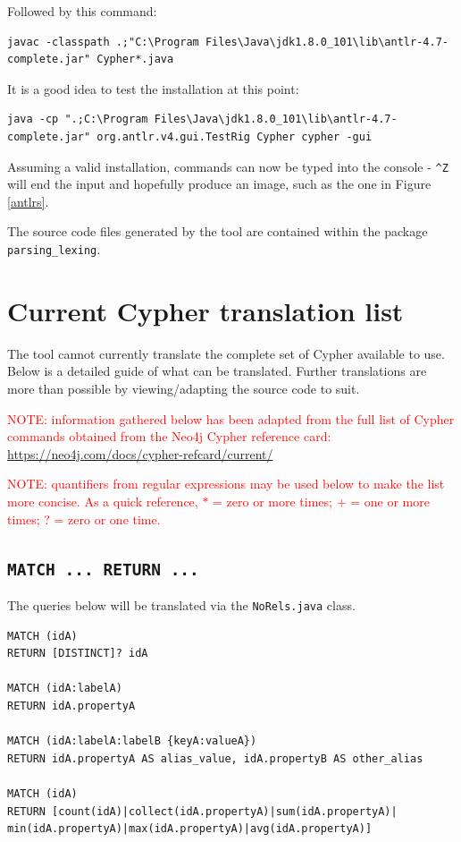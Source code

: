 \documentclass[letterpaper]{ltxdoc}
\begin{document}
Followed by this command:

\begin{lstlisting}[style=DOS]
javac -classpath .;"C:\Program Files\Java\jdk1.8.0_101\lib\antlr-4.7-complete.jar" Cypher*.java
\end{lstlisting}

It is a good idea to test the installation at this point:

\begin{lstlisting}[style=DOS]
java -cp ".;C:\Program Files\Java\jdk1.8.0_101\lib\antlr-4.7-complete.jar" org.antlr.v4.gui.TestRig Cypher cypher -gui
\end{lstlisting}

Assuming a valid installation, commands can now be typed into the console - \texttt{\^{}Z} will end the input and hopefully produce an image, such as the one in Figure \ref{antlrs}.

The source code files generated by the tool are contained within the package \texttt{parsing\_lexing}.

\section{Current Cypher translation list}
The tool cannot currently translate the complete set of Cypher available to use. Below is a detailed guide of what can be translated. Further translations are more than possible by viewing/adapting the source code to suit.

\medskip

\textcolor{red}{NOTE: information gathered below has been adapted from the full list of Cypher commands obtained from the Neo4j Cypher reference card: \url{https://neo4j.com/docs/cypher-refcard/current/}}

\medskip

\textcolor{red}{NOTE: quantifiers from regular expressions may be used below to make the list more concise. As a quick reference, ${*}$ = zero or more times; + = one or more times; ? = zero or one time.}

\medskip

\subsection*{\texttt{MATCH ... RETURN ...}}
The queries below will be translated via the \texttt{NoRels.java} class.

\medskip

\begin{lstlisting}[language = Cypher]
MATCH (idA)
RETURN [DISTINCT]? idA

MATCH (idA:labelA)
RETURN idA.propertyA

MATCH (idA:labelA:labelB {keyA:valueA})
RETURN idA.propertyA AS alias_value, idA.propertyB AS other_alias

MATCH (idA)
RETURN [count(idA)|collect(idA.propertyA)|sum(idA.propertyA)|
min(idA.propertyA)|max(idA.propertyA)|avg(idA.propertyA)]
\end{lstlisting}
\end{document}
